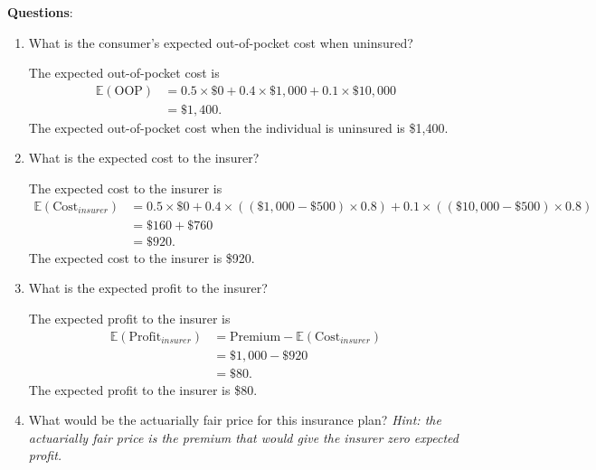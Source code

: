 \documentclass[12pt]{article}
\begin{document}
\vspace{3mm}

\textbf{Questions}:
\begin{enumerate}
    \item What is the consumer's expected out-of-pocket cost when uninsured?

    \vspace{3mm}
    { \color{darkblue}

    The expected out-of-pocket cost is
    \begin{align*}
    \mathbb{E}(\text{OOP})
    &= 0.5 \times \$0 + 0.4 \times \$1{,}000 + 0.1 \times \$10,000\\
    &= \$1{,}400.
    \end{align*}
    The expected out-of-pocket cost when the individual is uninsured is \$1,400.
    }

    \item What is the expected cost to the insurer?

    \vspace{3mm}
    { \color{darkblue}

    The expected cost to the insurer is
    \begin{align*}
    \mathbb{E}(\text{Cost}_{insurer})
    &= 0.5 \times \$0 + 0.4 \times \left( (\$1{,}000 - \$500) \times 0.8 \right) + 0.1 \times \left( (\$10{,}000 - \$500) \times 0.8 \right) \\
    &= \$160 + \$760 \\
    &= \$920.
    \end{align*}
    The expected cost to the insurer is \$920.
    }

    \item What is the expected profit to the insurer?

    \vspace{3mm}
    { \color{darkblue}
    The expected profit to the insurer is
    \begin{align*}
    \mathbb{E}(\text{Profit}_{insurer})
    &= \text{Premium} - \mathbb{E}(\text{Cost}_{insurer}) \\
    &= \$1{,}000 - \$920 \\
    &= \$80.
    \end{align*}
    The expected profit to the insurer is \$80.
    }

    \item What would be the actuarially fair price for this insurance plan?
    \textit{Hint: the actuarially fair price is the premium that would give the insurer zero expected profit.}\\


\end{enumerate}
\end{document}
